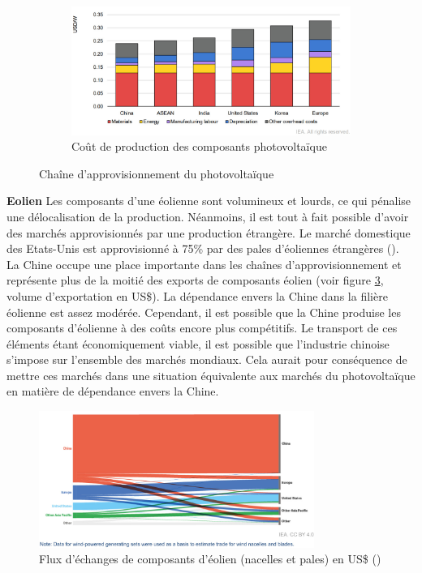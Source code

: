 \begin{figure}[!t]
\begin{subfigure}{0.8\textwidth}
\end{subfigure}
\begin{subfigure}{0.7\textwidth}
    \includegraphics[width=\textwidth]{Images/supply_chain/PV_production_costs.jpg}
    \caption{Coût de production des composants photovoltaïque \cite{iea_special_2022}}
    \label{fig:PV_cost}
\end{subfigure}
  
\caption{Chaîne d'approvisionnement du photovoltaïque}
\label{fig:supply_key_elements_PV}
\end{figure}
\clearpage
\textbf{Eolien}
\smallbreak
Les composants d'une éolienne sont volumineux et lourds, ce qui pénalise une délocalisation de la production. Néanmoins, il est tout à fait possible d'avoir des marchés approvisionnés par une production étrangère. Le marché domestique des Etats-Unis est approvisionné à 75\% par des pales d'éoliennes étrangères (\cite{iea_energy_2023}). La Chine occupe une place importante dans les chaînes d'approvisionnement et représente plus de la moitié des exports de composants éolien (voir figure \ref{fig:wind_sankey}, volume d'exportation en US\$).
\smallbreak
La dépendance envers la Chine dans la filière éolienne est assez modérée. Cependant, il est possible que la Chine produise les composants d'éolienne à des coûts encore plus compétitifs. Le transport de ces éléments étant économiquement viable, il est possible que l'industrie chinoise s'impose sur l'ensemble des marchés mondiaux. Cela aurait pour conséquence de mettre ces marchés dans une situation équivalente aux marchés du photovoltaïque en matière de dépendance envers la Chine.
\begin{figure}[!h]
    \centering
    \includegraphics[width=0.8\textwidth]{Images/supply_chain/sankey_diagram_wind.jpg}
    \caption{Flux d'échanges de composants d'éolien (nacelles et pales) en US\$ (\cite{iea_energy_2023})}
    \label{fig:wind_sankey}
\end{figure}

